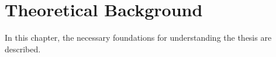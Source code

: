 \chapter{Theoretical Background}
In this chapter, the necessary foundations for understanding the thesis are described.
\newpage